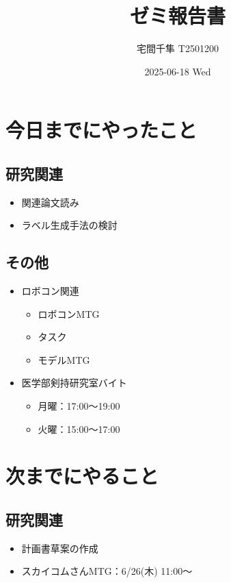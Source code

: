 \documentclass[uplatex, onecolumn, 10pt]{jsarticle}
\begin{document}
\title{\vspace{-40mm}\bf{\LARGE{ゼミ報告書}}}
\author{\vspace{-40mm}宅間千隼 T2501200}
\date{2025-06-18 Wed}
\maketitle


\section{今日までにやったこと}

\subsection*{研究関連} 
\begin{itemize}
    \item 関連論文読み
    \item ラベル生成手法の検討
\end{itemize}

\subsection*{その他}
\begin{itemize}
	\item ロボコン関連
	\begin{itemize}
		\item ロボコンMTG
		\item タスク
		\item モデルMTG
	\end{itemize}
	\item 医学部剣持研究室バイト
	\begin{itemize}
		\item 月曜：17:00～19:00
		\item 火曜：15:00～17:00
	\end{itemize}
\end{itemize}


\section{次までにやること}

\subsection*{研究関連}
\begin{itemize}
	\item 計画書草案の作成
	\item スカイコムさんMTG：6/26(木) 11:00～
\end{itemize}
\end{document}

